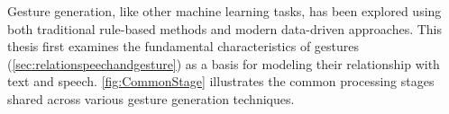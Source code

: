


Gesture generation, like other machine learning tasks, has been explored using both traditional rule-based methods and modern data-driven approaches. This thesis first examines the fundamental characteristics of gestures (\autoref{sec:relationspeechandgesture}) as a basis for modeling their relationship with text and speech. \autoref{fig:CommonStage} illustrates the common processing stages shared across various gesture generation techniques.


